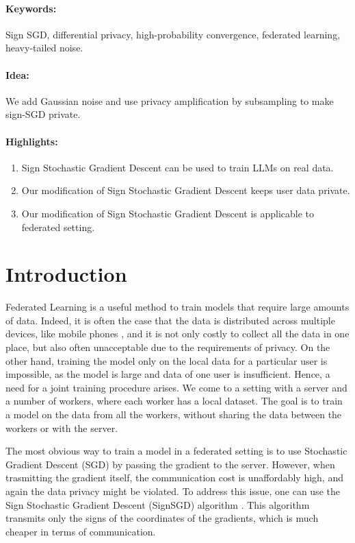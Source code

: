 \documentclass[12pt]{article}
\newcommand{\algname}[1]{{\sf  #1}\xspace}
\begin{document}
\paragraph{Keywords:} Sign SGD, differential privacy, high-probability convergence, federated learning, heavy-tailed noise.
\paragraph{Idea:} We add Gaussian noise and use privacy amplification by subsampling to make sign-SGD private.

\paragraph{Highlights:}
\begin{enumerate}
\item Sign Stochastic Gradient Descent can be used to train LLMs on real data.
\item Our modification of Sign Stochastic Gradient Descent keeps user data private.
\item Our modification of Sign Stochastic Gradient Descent is applicable to federated setting.
\end{enumerate}

\section{Introduction}
Federated Learning is a useful method to train models that require large amounts of data. Indeed, it is often the case that the data is distributed across multiple devices, like mobile phones \parencite{McMahan2017}, and it is not only costly to collect all the data in one place, but also often unacceptable due to the requirements of privacy. On the other hand, training the model only on the local data for a particular user is impossible, as the model is large and data of one user is insufficient. Hence, a need for a joint training procedure arises. We come to a setting with a server and a number of workers, where each worker has a local dataset. The goal is to train a model on the data from all the workers, without sharing the data between the workers or with the server.

The most obvious way to train a model in a federated setting is to use Stochastic Gradient Descent (\algname{SGD}) \parencite{Robbins1951} by passing the gradient to the server. However, when trasmitting the gradient itself, the communication cost is unaffordably high, and again the data privacy might be violated. To address this issue, one can use the Sign Stochastic Gradient Descent (\algname{SignSGD}) algorithm \parencite{Bernstein2018}. This algorithm transmits only the signs of the coordinates of the gradients, which is much cheaper in terms of communication.
\end{document}
